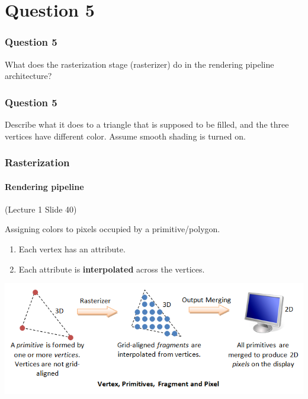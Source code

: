 \documentclass{beamer}
\begin{document}
\section{Question 5}

\begin{frame}
    \frametitle{Question 5}
    What does the rasterization stage (rasterizer) do in the rendering pipeline architecture?
\end{frame}

\begin{frame}
    \frametitle{Question 5}
    Describe what it does to a triangle that is supposed to be filled, and the three vertices have
    different color. Assume smooth shading is turned on.
\end{frame}

\begin{frame}
    \frametitle{Rasterization}
    \framesubtitle{Rendering pipeline}

    (Lecture 1 Slide 40)

    Assigning colors to pixels occupied by a primitive/polygon.

    \begin{enumerate}
        \item Each vertex has an attribute.
        \item Each attribute is \textbf{interpolated} across the vertices.
    \end{enumerate}

    \vspace{1em}

    {\begin{center} \includegraphics[scale=0.5]{q5-Graphics3D_VertexFragment.png} \end{center}}

\end{frame}
\end{document}
